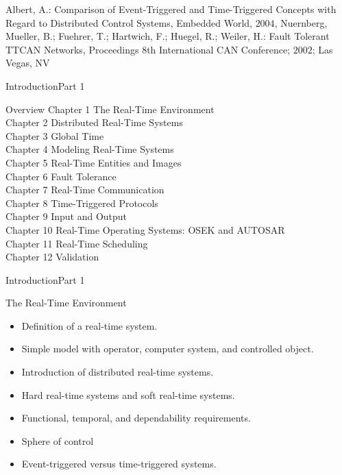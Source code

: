 \begin{frame}
\vspace*{1ex}

  \begin{thebibliography}{9}
  \beamertemplatearticlebibitems

    Albert, A.: Comparison of Event-Triggered and Time-Triggered Concepts with
    Regard to Distributed Control Systems, Embedded World, $2004$, Nuernberg,
    Mueller, B.; Fuehrer, T.; Hartwich, F.; Huegel, R.; Weiler, H.:    Fault
    Tolerant TTCAN Networks, Proceedings $8$th International CAN Conference; $2002$; Las
    Vegas, NV %



  \end{thebibliography}

\end{frame}

\begin{frame}{Introduction}{Part 1}
    \begin{block}{Overview}
Chapter 1	  The Real-Time Environment\\
Chapter 2	  Distributed Real-Time Systems\\
Chapter 3	  Global Time\\
Chapter 4	  Modeling Real-Time Systems\\
Chapter 5	  Real-Time Entities and Images\\
Chapter 6	  Fault Tolerance\\
Chapter 7	  Real-Time Communication\\
Chapter 8	  Time-Triggered Protocols\\
Chapter 9	  Input and Output\\
Chapter 10	Real-Time Operating Systems: OSEK and AUTOSAR\\
Chapter 11	Real-Time Scheduling\\
Chapter 12	Validation
\end{block}
\end{frame}


\begin{frame}{Introduction}{Part 1}
    \begin{block}{The Real-Time Environment}
\begin{itemize}
\item
  Definition of a real-time system.
\item
  Simple model with operator, computer system, and controlled object.
\item
  Introduction of distributed real-time systems.
\item
  Hard real-time systems and soft real-time systems.
\item
  Functional, temporal, and dependability requirements.
\item
  Sphere of control
\item
  Event-triggered versus time-triggered systems.
\end{itemize}
\end{block}
\end{frame}

